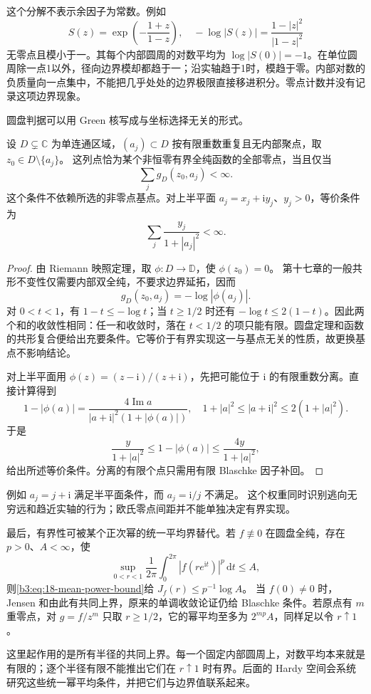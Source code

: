 这个分解不表示余因子为常数。例如
\[
 S(z)=\exp\left(-\frac{1+z}{1-z}\right),\quad
 -\log|S(z)|=\frac{1-|z|^2}{|1-z|^2}
\]
无零点且模小于一。其每个内部圆周的对数平均为
\(\log|S(0)|=-1\)。在单位圆周除一点1以外，径向边界模却都趋于一；沿实轴趋于1时，模趋于零。内部对数的负质量向一点集中，不能把几乎处处的边界极限直接移进积分。零点计数并没有记录这项边界现象。

\ProseParagraphBreak
圆盘判据可以用 Green 核写成与坐标选择无关的形式。

\begin{proposition}[单连通域的有界零点判据]\label{b3:prop:18-conformal-zero-condition}
设 \(D\subsetneq\mathbb C\) 为单连通区域，\((a_j)\subset D\) 按有限重数重复且无内部聚点，取 \(z_0\in D\setminus\{a_j\}\)。
这列点恰为某个非恒零有界全纯函数的全部零点，当且仅当
\[
 \sum_jg_D(z_0,a_j)<\infty.
\]
这个条件不依赖所选的非零点基点。对上半平面
\(a_j=x_j+\mathrm iy_j\)、\(y_j>0\)，等价条件为
\[
 \sum_j\frac{y_j}{1+|a_j|^2}<\infty.
\]
\end{proposition}
\begin{proof}
由 Riemann 映照定理，取 \(\phi:D\to\mathbb D\)，使 \(\phi(z_0)=0\)。
第十七章的一般共形不变性仅需要内部双全纯，不要求边界延拓，因而
\[
 g_D(z_0,a_j)=-\log|\phi(a_j)|.
\]
对 \(0<t<1\)，有 \(1-t\le-\log t\)；当 \(t\ge1/2\) 时还有
\(-\log t\le2(1-t)\)。因此两个和的收敛性相同：任一和收敛时，落在 \(t<1/2\) 的项只能有限。圆盘定理和函数的共形复合便给出充要条件。它等价于有界实现这一与基点无关的性质，故更换基点不影响结论。

对上半平面用 \(\phi(z)=(z-\mathrm i)/(z+\mathrm i)\)，先把可能位于 \(\mathrm i\) 的有限重数分离。直接计算得到
\[
 1-|\phi(a)|=\frac{4\operatorname{Im}a}
 {|a+\mathrm i|^2(1+|\phi(a)|)},\quad
 1+|a|^2\le|a+\mathrm i|^2\le2(1+|a|^2).
\]
于是
\[
 \frac{y}{1+|a|^2}\le1-|\phi(a)|
 \le\frac{4y}{1+|a|^2},
\]
给出所述等价条件。分离的有限个点只需用有限 Blaschke 因子补回。
\end{proof}

例如 \(a_j=j+\mathrm i\) 满足半平面条件，而 \(a_j=\mathrm i/j\) 不满足。
这个权重同时识别逃向无穷远和趋近实轴的行为；欧氏零点间距并不能单独决定有界实现。

\ProseParagraphBreak
最后，有界性可被某个正次幂的统一平均界替代。若 \(f\not\equiv0\) 在圆盘全纯，存在 \(p>0\)、\(A<\infty\)，使
\[
 \sup_{0<r<1}\frac1{2\pi}\int_0^{2\pi}
       |f(re^{\mathrm it})|^p\,\mathrm dt\le A,
\]
则\eqref{b3:eq:18-mean-power-bound}给 \(J_f(r)\le p^{-1}\log A\)。
当 \(f(0)\ne0\) 时，Jensen 和由此有共同上界，原来的单调收敛论证仍给 Blaschke 条件。若原点有 \(m\) 重零点，对 \(g=f/z^m\) 只取 \(r\ge1/2\)，它的幂平均至多为 \(2^{mp}A\)，同样足以令 \(r\uparrow1\)。

\ProseParagraphBreak
这里起作用的是所有半径的共同上界。每一个固定内部圆周上，对数平均本来就是有限的；逐个半径有限不能推出它们在 \(r\uparrow1\) 时有界。后面的 Hardy 空间会系统研究这些统一幂平均条件，并把它们与边界值联系起来。
